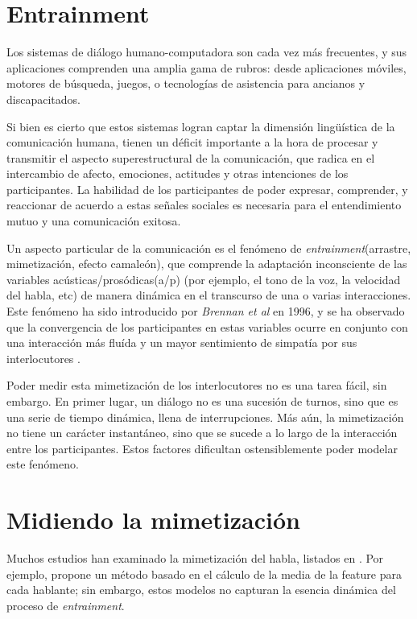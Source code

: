 
\section{Entrainment}

Los sistemas de diálogo humano-computadora son cada vez más frecuentes, y sus aplicaciones comprenden una amplia gama de rubros: desde aplicaciones móviles, motores de búsqueda, juegos, o tecnologías de asistencia para ancianos y discapacitados.

Si bien es cierto que estos sistemas logran captar la dimensión lingüística de la comunicación humana, tienen un déficit importante a la hora de procesar y transmitir el aspecto superestructural de la comunicación, que radica en el intercambio de afecto, emociones, actitudes y otras intenciones de los participantes. La habilidad de los participantes de poder expresar, comprender, y reaccionar de acuerdo a estas señales sociales es necesaria para el entendimiento mutuo y una comunicación exitosa.

Un aspecto particular de la comunicación es el fenómeno de \emph{entrainment}(arrastre, mimetización, efecto camaleón), que comprende la adaptación inconsciente de las variables acústicas/prosódicas(a/p) (por ejemplo, el tono de la voz, la velocidad del habla, etc) de manera dinámica en el transcurso de una o varias interacciones. Este fenómeno ha sido introducido por \emph{Brennan et al}\cite{BRE1996} en 1996, y se ha observado que la convergencia de los participantes en estas variables ocurre en conjunto con una interacción más fluída y un mayor sentimiento de simpatía por sus interlocutores \cite{CHAR1999}.

Poder medir esta mimetización de los interlocutores no es una tarea fácil, sin embargo. En primer lugar, un diálogo no es una sucesión de turnos, sino que es una serie de tiempo dinámica, llena de interrupciones. Más aún, la mimetización no tiene un carácter instantáneo, sino que se sucede a lo largo de la interacción entre los participantes. Estos factores dificultan ostensiblemente poder modelar este fenómeno.

\section{Midiendo la mimetización}

Muchos estudios han examinado la mimetización del habla, listados en \cite{DEL2013}. Por ejemplo, \cite{LEV2012} propone un método basado en el cálculo de la media de la feature para cada hablante; sin embargo, estos modelos no capturan la esencia dinámica del proceso de \emph{entrainment}.

